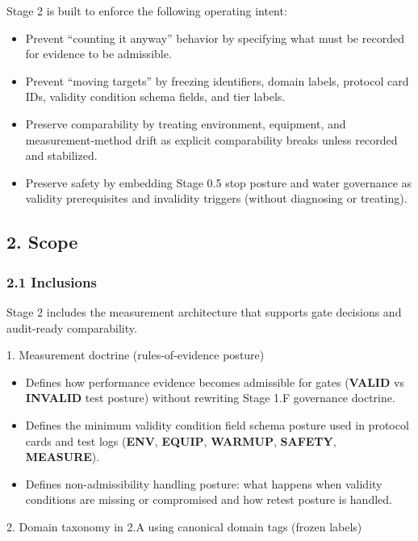 \documentclass[10pt]{article}
\begin{document}
Stage 2 is built to enforce the following operating intent:

\begin{itemize}
\item Prevent “counting it anyway” behavior by specifying what must be recorded for evidence to be admissible.
\item Prevent “moving targets” by freezing identifiers, domain labels, protocol card IDs, validity condition schema fields, and tier labels.
\item Preserve comparability by treating environment, equipment, and measurement-method drift as explicit comparability breaks unless recorded and stabilized.
\item Preserve safety by embedding Stage 0.5 stop posture and water governance as validity prerequisites and invalidity triggers (without diagnosing or treating).
\end{itemize}

\subsection*{2. Scope}

\subsubsection*{2.1 Inclusions}

Stage 2 includes the measurement architecture that supports gate decisions and audit-ready comparability.

1. Measurement doctrine (rules-of-evidence posture)

\begin{itemize}
\item Defines how performance evidence becomes admissible for gates (\textbf{VALID} vs \textbf{INVALID} test posture) without rewriting Stage 1.F governance doctrine.
\item Defines the minimum validity condition field schema posture used in protocol cards and test logs (\textbf{ENV}, \textbf{EQUIP}, \textbf{WARMUP}, \textbf{SAFETY}, \textbf{MEASURE}).
\item Defines non-admissibility handling posture: what happens when validity conditions are missing or compromised and how retest posture is handled.
\end{itemize}

2. Domain taxonomy in 2.A using canonical domain tags (frozen labels)
\end{document}
